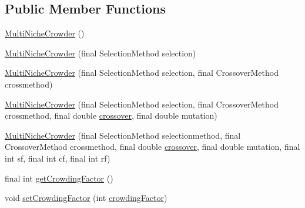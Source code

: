 \subsection*{Public Member Functions}
\begin{DoxyCompactItemize}
\item 
\hyperlink{classjenes_1_1stage_1_1operator_1_1common_1_1_multi_niche_crowder_3_01_t_01extends_01_chromosome_01_4_a0e3210ea1f2d3f1687f5c1f9a0f326dd}{Multi\-Niche\-Crowder} ()
\item 
\hyperlink{classjenes_1_1stage_1_1operator_1_1common_1_1_multi_niche_crowder_3_01_t_01extends_01_chromosome_01_4_a45d8181936a9298ecc7edcfee8647590}{Multi\-Niche\-Crowder} (final Selection\-Method selection)
\item 
\hyperlink{classjenes_1_1stage_1_1operator_1_1common_1_1_multi_niche_crowder_3_01_t_01extends_01_chromosome_01_4_a5f539242ac756ac79df20945afc5e425}{Multi\-Niche\-Crowder} (final Selection\-Method selection, final Crossover\-Method crossmethod)
\item 
\hyperlink{classjenes_1_1stage_1_1operator_1_1common_1_1_multi_niche_crowder_3_01_t_01extends_01_chromosome_01_4_ad6b691057f10397e80669b101c7f437a}{Multi\-Niche\-Crowder} (final Selection\-Method selection, final Crossover\-Method crossmethod, final double \hyperlink{classjenes_1_1stage_1_1operator_1_1common_1_1_multi_niche_crowder_3_01_t_01extends_01_chromosome_01_4_ad584be099b23576ec3379a6867d31ef4}{crossover}, final double mutation)
\item 
\hyperlink{classjenes_1_1stage_1_1operator_1_1common_1_1_multi_niche_crowder_3_01_t_01extends_01_chromosome_01_4_a7384c823b16fe8e5f8bfdc7db0c87ce5}{Multi\-Niche\-Crowder} (final Selection\-Method selectionmethod, final Crossover\-Method crossmethod, final double \hyperlink{classjenes_1_1stage_1_1operator_1_1common_1_1_multi_niche_crowder_3_01_t_01extends_01_chromosome_01_4_ad584be099b23576ec3379a6867d31ef4}{crossover}, final double mutation, final int sf, final int cf, final int rf)
\item 
final int \hyperlink{classjenes_1_1stage_1_1operator_1_1common_1_1_multi_niche_crowder_3_01_t_01extends_01_chromosome_01_4_a74363393b7e200fcff467ff5920e10d6}{get\-Crowding\-Factor} ()
\item 
void \hyperlink{classjenes_1_1stage_1_1operator_1_1common_1_1_multi_niche_crowder_3_01_t_01extends_01_chromosome_01_4_ad00602ac8b97b385a8a72fd612e2ac22}{set\-Crowding\-Factor} (int \hyperlink{classjenes_1_1stage_1_1operator_1_1common_1_1_multi_niche_crowder_3_01_t_01extends_01_chromosome_01_4_ad7320907a72bd19c028f922383667560}{crowding\-Factor})

\end{DoxyCompactItemize}
